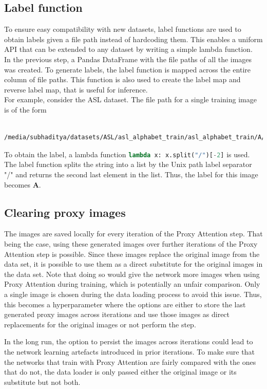\subsection{Label function} \label{sec:label_function}
To ensure easy compatibility with new datasets, label functions are used to obtain labels given a file path instead of hardcoding them. This enables a uniform API that can be extended to any dataset by writing a simple lambda function.\\
In the previous step, a Pandas DataFrame with the file paths of all the images was created. To generate labels, the label function is mapped across the entire column of file paths. This function is also used to create the label map and reverse label map, that is useful for inference.\\
For example, consider the ASL dataset. The file path for a single training image is of the form \begin{verbatim}
    /media/subhaditya/datasets/ASL/asl_alphabet_train/asl_alphabet_train/A/A1.jpg
\end{verbatim} To obtain the label, a lambda function
\lstinline[language=Python]{lambda x: x.split("/")[-2]}
is used.
The label function splits the string into a list by the Unix path label separator "/" and returns the second last element in the list. Thus, the label for this image becomes \textbf{A}.\\


\subsection{Clearing proxy images} \label{sec:clearing_proxy_images}
The images are saved locally for every iteration of the Proxy Attention step. That being the case, using these generated images over further iterations of the Proxy Attention step is possible. Since these images replace the original image from the data set, it is possible to use them as a direct substitute for the original images in the data set.  Note that doing so would give the network more images when using Proxy Attention during training, which is potentially an unfair comparison. Only a single image is chosen during the data loading process to avoid this issue. Thus, this becomes a hyperparameter where the options are either to store the last generated proxy images across iterations and use those images as direct replacements for the original images or not perform the step.

In the long run, the option to persist the images across iterations could lead to the network learning artefacts introduced in prior iterations. To make sure that the networks that train with Proxy Attention are fairly compared with the ones that do not, the data loader is only passed either the original image or its substitute but not both.

